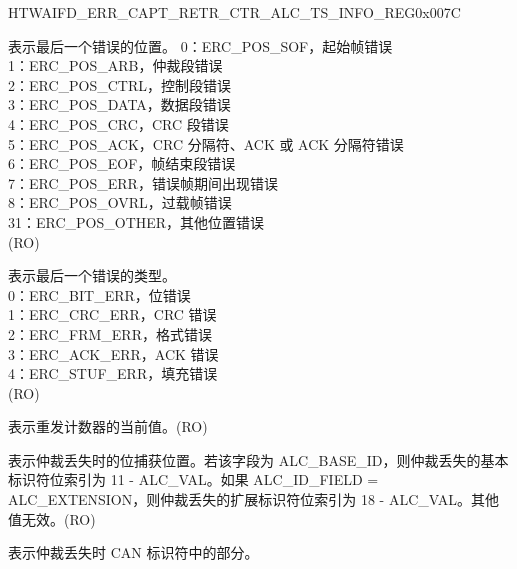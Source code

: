 \begin{register}{H}{TWAIFD\_ERR\_CAPT\_RETR\_CTR\_ALC\_TS\_INFO\_REG}{0x007C}\label{regdesc:TWAIFDERRCAPTRETRCTRALCTSINFOREG}
%
%
%
%
%
%
%
%
\regnewline%
\begin{regdesc}\begin{reglist}
\label{fielddesc:TWAIFDERRPOS}\item [TWAIFD\_ERR\_POS] 表示最后一个错误的位置。 
0：ERC\_POS\_SOF，起始帧错误\\
1：ERC\_POS\_ARB，仲裁段错误\\
2：ERC\_POS\_CTRL，控制段错误\\
3：ERC\_POS\_DATA，数据段错误\\
4：ERC\_POS\_CRC，CRC 段错误\\
5：ERC\_POS\_ACK，CRC 分隔符、ACK 或 ACK 分隔符错误\\
6：ERC\_POS\_EOF，帧结束段错误\\
7：ERC\_POS\_ERR，错误帧期间出现错误\\
8：ERC\_POS\_OVRL，过载帧错误\\
31：ERC\_POS\_OTHER，其他位置错误\\(RO)
\label{fielddesc:TWAIFDERRTYPE}\item [TWAIFD\_ERR\_TYPE] 表示最后一个错误的类型。\\
0：ERC\_BIT\_ERR，位错误\\
1：ERC\_CRC\_ERR，CRC 错误\\
2：ERC\_FRM\_ERR，格式错误\\
3：ERC\_ACK\_ERR，ACK 错误\\
4：ERC\_STUF\_ERR，填充错误 \\(RO)
\label{fielddesc:TWAIFDRETRCTRVAL}\item [TWAIFD\_RETR\_CTR\_VAL] 表示重发计数器的当前值。(RO)
\label{fielddesc:TWAIFDALCBIT}\item [TWAIFD\_ALC\_BIT] 表示仲裁丢失时的位捕获位置。若该字段为 ALC\_BASE\_ID，则仲裁丢失的基本标识符位索引为 11 - ALC\_VAL。如果 ALC\_ID\_FIELD = ALC\_EXTENSION，则仲裁丢失的扩展标识符位索引为 18 - ALC\_VAL。其他值无效。(RO)
\label{fielddesc:TWAIFDALCIDFIELD}\item [TWAIFD\_ALC\_ID\_FIELD] 表示仲裁丢失时 CAN 标识符中的部分。\\

\end{reglist}
\end{regdesc}
\end{register}
